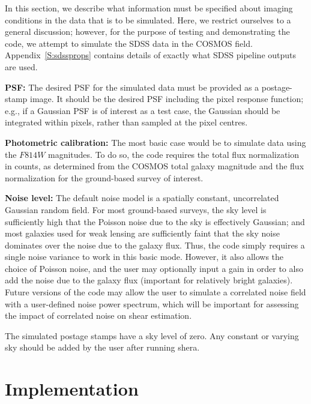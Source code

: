 \documentclass[twocolumn,useAMS,usenatbib]{mn2e}
\newcommand{\newtext}{}
\begin{document}
\newtext{In this section, we describe what information must be specified about
imaging conditions in the data that is to be simulated.  Here, we
restrict ourselves to a general discussion; however, for the purpose
of testing and demonstrating the code, we attempt to simulate the
SDSS data in the COSMOS field.  Appendix~\ref{S:sdssprops} contains details of exactly what SDSS pipeline
outputs are used.}

\newtext{\textbf{PSF:} The desired PSF for the simulated data must be provided as a
postage-stamp image.  It should be the desired PSF including the pixel
response function; e.g., if a Gaussian PSF is of interest as a test
case, the Gaussian should be integrated within pixels, rather than
sampled at the pixel centres.}

\newtext{\textbf{Photometric calibration:} The most basic case would be to
simulate data using the $F814W$ magnitudes.  To do so, the code
requires the total flux normalization in counts, as determined from
the COSMOS total galaxy magnitude and the flux normalization for the
ground-based survey of interest.}  %

\newtext{\textbf{Noise level:} The default noise model is a spatially constant,
uncorrelated Gaussian random field.  For most ground-based surveys,
the sky level is sufficiently high that the Poisson noise due to the
sky is effectively Gaussian; and most galaxies used for weak lensing
are sufficiently faint that the sky noise dominates over the noise due
to the galaxy flux.  Thus, the code simply requires a single noise
variance to work in this basic mode.  However, it also allows the
choice of Poisson noise, and the user may optionally input a gain in
order to also add the noise due to the galaxy flux (important for
relatively bright galaxies).  
Future versions of the code may
allow the user to simulate a correlated noise field
with a user-defined noise power spectrum, which will be important for
assessing the impact of correlated noise on shear estimation.}

\newtext{The simulated postage stamps have a sky level of zero.  Any constant
or varying sky should be added by the user after running {\sc shera}.
} 


\section{Implementation}\label{S:implementation}
\end{document}
